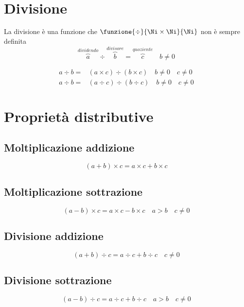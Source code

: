  \section{Divisione}
 \begin{defn}[Divisione]
 La divisione è una funzione che $\funzione{\div}{\Ni\times\Ni}{\Ni}$ non è sempre definita
 \begin{equation*}
 \overbrace{a}^{dividendo}\div\overbrace{b}^{divisore}=\overbrace{c}^{quoziente}\quad b\neq 0
 \end{equation*}
 \end{defn}
\begin{prop}
\begin{align*}
a\div b=&(a\times c)\div (b\times c)\quad b\neq 0\quad c \neq 0\\
a\div b=&(a\div c)\div (b\div c)\quad b\neq 0\quad c \neq 0
\end{align*}
\end{prop}

\section{Proprietà distributive}
\subsection{Moltiplicazione addizione}
\begin{equation*}
(a+b)\times c=a\times c+b\times c
\end{equation*}
\subsection{Moltiplicazione sottrazione}
\begin{equation*}
(a-b)\times c=a\times c-b\times c\quad a>b\quad c\neq 0
\end{equation*}
\subsection{Divisione addizione}
\begin{equation*}
(a+b)\div c=a\div c+b\div c\quad c\neq 0
\end{equation*}
\subsection{Divisione sottrazione}
\begin{equation*}
(a-b)\div c=a\div c+b\div c\quad a>b\quad c\neq 0
\end{equation*}
